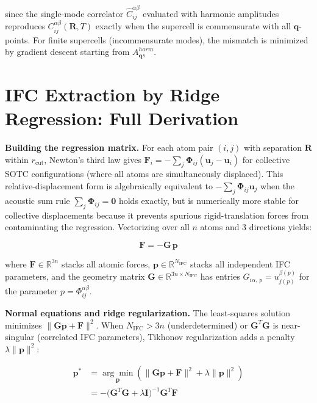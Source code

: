 \documentclass[aps,prb,reprint,amsmath,amssymb,floatfix]{revtex4-2}
\begin{document}
since the single-mode correlator \(\hat{C}_{ij}^{\alpha\beta}\)
evaluated with harmonic amplitudes reproduces
\(C_{ij}^{\alpha\beta}(\mathbf{R},T)\) exactly when the supercell is
commensurate with all \(\mathbf{q}\)-points. For finite supercells
(incommensurate modes), the mismatch is minimized by gradient descent
starting from \(A_{\mathbf{q}s}^{harm}\).


\section{IFC Extraction by Ridge Regression: Full
Derivation}\label{appendix-d-ifc-extraction-by-ridge-regression-full-derivation}

\textbf{Building the regression matrix.} For each atom pair \((i,j)\)
with separation \(\mathbf{R}\) within \(r_\text{cut}\), Newton's third
law gives
\(\mathbf{F}_i = -\sum_{j}\boldsymbol{\Phi}_{ij}(\mathbf{u}_j - \mathbf{u}_i)\)
for collective SOTC configurations (where all atoms are simultaneously
displaced). This relative-displacement form is algebraically equivalent
to \(-\sum_j\boldsymbol{\Phi}_{ij}\mathbf{u}_j\) when the acoustic sum
rule \(\sum_j\boldsymbol{\Phi}_{ij} = \mathbf{0}\) holds exactly, but is
numerically more stable for collective displacements because it prevents
spurious rigid-translation forces from contaminating the regression.
Vectorizing over all \(n\) atoms and 3 directions yields:

\begin{equation*}
\mathbf{F} = -\mathbf{G}\,\mathbf{p}
\end{equation*}

where \(\mathbf{F} \in \mathbb{R}^{3n}\) stacks all atomic forces,
\(\mathbf{p} \in \mathbb{R}^{N_\text{IFC}}\) stacks all independent IFC
parameters, and the geometry matrix
\(\mathbf{G} \in \mathbb{R}^{3n \times N_\text{IFC}}\) has entries
\(G_{i\alpha,\,p} = u_{j(p)}^{\beta(p)}\) for the parameter
\(p = \Phi_{ij}^{\alpha\beta}\).

\textbf{Normal equations and ridge regularization.} The least-squares
solution minimizes \(\|\mathbf{G}\mathbf{p} + \mathbf{F}\|^2\). When
\(N_\text{IFC} > 3n\) (underdetermined) or \(\mathbf{G}^T\mathbf{G}\) is
near-singular (correlated IFC parameters), Tikhonov regularization adds
a penalty \(\lambda\|\mathbf{p}\|^2\):

\begin{align*}
\mathbf{p}^*
  &= \underset{\mathbf{p}}{\arg\min}\left(\|\mathbf{G}\mathbf{p} + \mathbf{F}\|^2 + \lambda\|\mathbf{p}\|^2\right) \\
  &= -\bigl(\mathbf{G}^T\mathbf{G}+\lambda\mathbf{I}\bigr)^{-1}\mathbf{G}^T\mathbf{F}
\end{align*}
\end{document}
